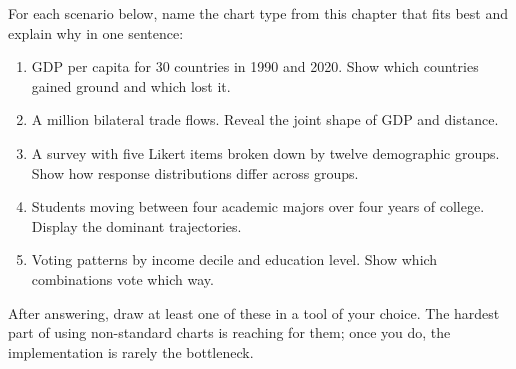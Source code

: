 \documentclass[
  letterpaper,
  11pt,
  twoside,
  openany]{scrbook}
\providecommand{\tightlist}{%
  \setlength{\itemsep}{0pt}\setlength{\parskip}{0pt}}
\begin{document}
\begin{tcolorbox}[enhanced jigsaw, arc=.35mm, bottomrule=.15mm, bottomtitle=1mm, breakable, colback=white, colbacktitle=quarto-callout-tip-color!10!white, colframe=quarto-callout-tip-color-frame, coltitle=black, left=2mm, leftrule=.75mm, opacityback=0, opacitybacktitle=0.6, rightrule=.15mm, title=\textcolor{quarto-callout-tip-color}{\faLightbulb}\hspace{0.5em}{Try this}, titlerule=0mm, toprule=.15mm, toptitle=1mm]

For each scenario below, name the chart type from this chapter that fits
best and explain why in one sentence:

\begin{enumerate}
\def\labelenumi{\arabic{enumi}.}
\tightlist
\item
  GDP per capita for 30 countries in 1990 and 2020. Show which countries
  gained ground and which lost it.
\item
  A million bilateral trade flows. Reveal the joint shape of GDP and
  distance.
\item
  A survey with five Likert items broken down by twelve demographic
  groups. Show how response distributions differ across groups.
\item
  Students moving between four academic majors over four years of
  college. Display the dominant trajectories.
\item
  Voting patterns by income decile and education level. Show which
  combinations vote which way.
\end{enumerate}

After answering, draw at least one of these in a tool of your choice.
The hardest part of using non-standard charts is reaching for them; once
you do, the implementation is rarely the bottleneck.

\end{tcolorbox}
\end{document}
